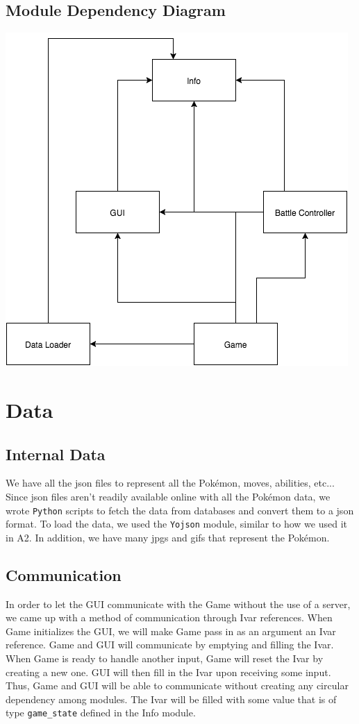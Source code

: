\documentclass{scrreprt}
\begin{document}
\subsection{Module Dependency Diagram}
\includegraphics[scale=0.75]{MDD.png}

\section{Data}
\subsection{Internal Data}
We have all the json files to represent all the Pok\'emon, moves, abilities, etc... Since json files aren't readily available online with all the Pok\'emon data, we wrote \texttt{Python} scripts to fetch the data from databases and convert them to a json format. To load the data, we used the \texttt{Yojson} module, similar to how we used it in A2. In addition, we have many jpgs and gifs that represent the Pok\'emon. 

\subsection{Communication}
In order to let the GUI communicate with the Game without the use of a server, we came up with a method of communication through Ivar references. When Game initializes the GUI, we will make Game pass in as an argument an Ivar reference. Game and GUI will communicate by emptying and filling the Ivar. When Game is ready to handle another input, Game will reset the Ivar by creating a new one. GUI will then fill in the Ivar upon receiving some input. Thus, Game and GUI will be able to communicate without creating any circular dependency among modules. The Ivar will be filled with some value that is of type \texttt{game\_state} defined in the Info module. 
\end{document}
